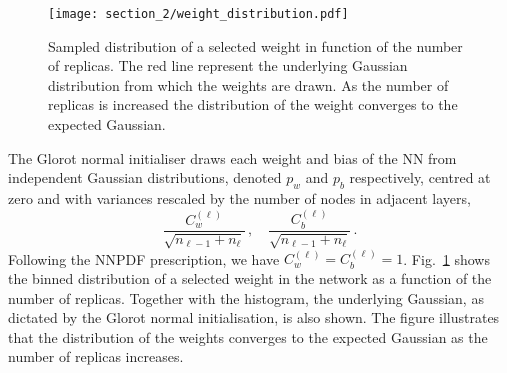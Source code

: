\begin{figure}[t!]
  \centering
  \texttt{[image: section\_2/weight\_distribution.pdf]}
  \caption{Sampled distribution of a selected weight in function of the
  number of replicas. The red line represent the underlying Gaussian distribution
  from which the weights are drawn. As the number of replicas is increased the 
  distribution of the weight converges to the expected Gaussian.}
  \label{fig:weight_distribution}
\end{figure}
The Glorot normal initialiser draws each weight and bias of the NN from independent Gaussian
distributions, denoted $p_w$ and $p_b$ respectively, centred at zero and with variances
rescaled by the number of nodes in adjacent layers,
\begin{equation}
    \label{eq:RescaledGlorotVariances}
    \frac{C^{(\ell)}_{w}}{\sqrt{n_{\ell-1} + n_{\ell}}}\, ,
    \quad \frac{C^{(\ell)}_{b}}{\sqrt{n_{\ell-1} + n_{\ell}}}\, .
\end{equation}
Following the NNPDF prescription, we have $C^{(\ell)}_{w}=C^{(\ell)}_{b}=1$.
Fig.~\ref{fig:weight_distribution} shows the binned distribution of a selected
weight in the network as a function of the number of replicas. Together with the
histogram, the underlying Gaussian, as dictated by the Glorot normal
initialisation, is also shown. The figure illustrates that the distribution of
the weights converges to the expected Gaussian as the number of replicas increases.

